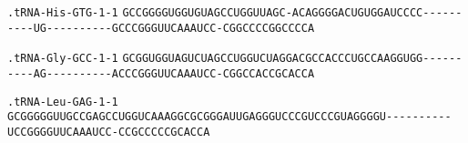 \documentclass{article}
\newcommand{\rnabox}[1]{\colorbox{#1}{\texttt{#1}}}
\begin{document}
\texttt{.tRNA-His-GTG-1-1}
\rnabox{G}\rnabox{C}\rnabox{C}\rnabox{G}\rnabox{G}\rnabox{G}\rnabox{G}\rnabox{U}\rnabox{G}\rnabox{G}\rnabox{U}\rnabox{G}\rnabox{U}\rnabox{A}\rnabox{G}\rnabox{C}\rnabox{C}\rnabox{U}\rnabox{G}\rnabox{G}\rnabox{U}\rnabox{U}\rnabox{A}\rnabox{G}\rnabox{C}\rnabox{-}\rnabox{A}\rnabox{C}\rnabox{A}\rnabox{G}\rnabox{G}\rnabox{G}\rnabox{G}\rnabox{A}\rnabox{C}\rnabox{U}\rnabox{G}\rnabox{U}\rnabox{G}\rnabox{G}\rnabox{A}\rnabox{U}\rnabox{C}\rnabox{C}\rnabox{C}\rnabox{C}\rnabox{-}\rnabox{-}\rnabox{-}\rnabox{-}\rnabox{-}\rnabox{-}\rnabox{-}\rnabox{-}\rnabox{-}\rnabox{-}\rnabox{U}\rnabox{G}\rnabox{-}\rnabox{-}\rnabox{-}\rnabox{-}\rnabox{-}\rnabox{-}\rnabox{-}\rnabox{-}\rnabox{-}\rnabox{-}\rnabox{G}\rnabox{C}\rnabox{C}\rnabox{C}\rnabox{G}\rnabox{G}\rnabox{G}\rnabox{U}\rnabox{U}\rnabox{C}\rnabox{A}\rnabox{A}\rnabox{A}\rnabox{U}\rnabox{C}\rnabox{C}\rnabox{-}\rnabox{C}\rnabox{G}\rnabox{G}\rnabox{C}\rnabox{C}\rnabox{C}\rnabox{C}\rnabox{G}\rnabox{G}\rnabox{C}\rnabox{C}\rnabox{C}\rnabox{C}\rnabox{A}

\vspace{-0.5mm}

\texttt{.tRNA-Gly-GCC-1-1}
\rnabox{G}\rnabox{C}\rnabox{G}\rnabox{G}\rnabox{U}\rnabox{G}\rnabox{G}\rnabox{U}\rnabox{A}\rnabox{G}\rnabox{U}\rnabox{C}\rnabox{U}\rnabox{A}\rnabox{G}\rnabox{C}\rnabox{C}\rnabox{U}\rnabox{G}\rnabox{G}\rnabox{U}\rnabox{C}\rnabox{U}\rnabox{A}\rnabox{G}\rnabox{G}\rnabox{A}\rnabox{C}\rnabox{G}\rnabox{C}\rnabox{C}\rnabox{A}\rnabox{C}\rnabox{C}\rnabox{C}\rnabox{U}\rnabox{G}\rnabox{C}\rnabox{C}\rnabox{A}\rnabox{A}\rnabox{G}\rnabox{G}\rnabox{U}\rnabox{G}\rnabox{G}\rnabox{-}\rnabox{-}\rnabox{-}\rnabox{-}\rnabox{-}\rnabox{-}\rnabox{-}\rnabox{-}\rnabox{-}\rnabox{-}\rnabox{A}\rnabox{G}\rnabox{-}\rnabox{-}\rnabox{-}\rnabox{-}\rnabox{-}\rnabox{-}\rnabox{-}\rnabox{-}\rnabox{-}\rnabox{-}\rnabox{A}\rnabox{C}\rnabox{C}\rnabox{C}\rnabox{G}\rnabox{G}\rnabox{G}\rnabox{U}\rnabox{U}\rnabox{C}\rnabox{A}\rnabox{A}\rnabox{A}\rnabox{U}\rnabox{C}\rnabox{C}\rnabox{-}\rnabox{C}\rnabox{G}\rnabox{G}\rnabox{C}\rnabox{C}\rnabox{A}\rnabox{C}\rnabox{C}\rnabox{G}\rnabox{C}\rnabox{A}\rnabox{C}\rnabox{C}\rnabox{A}

\vspace{-0.5mm}

\texttt{.tRNA-Leu-GAG-1-1}
\rnabox{G}\rnabox{C}\rnabox{G}\rnabox{G}\rnabox{G}\rnabox{G}\rnabox{G}\rnabox{U}\rnabox{U}\rnabox{G}\rnabox{C}\rnabox{C}\rnabox{G}\rnabox{A}\rnabox{G}\rnabox{C}\rnabox{C}\rnabox{U}\rnabox{G}\rnabox{G}\rnabox{U}\rnabox{C}\rnabox{A}\rnabox{A}\rnabox{A}\rnabox{G}\rnabox{G}\rnabox{C}\rnabox{G}\rnabox{C}\rnabox{G}\rnabox{G}\rnabox{G}\rnabox{A}\rnabox{U}\rnabox{U}\rnabox{G}\rnabox{A}\rnabox{G}\rnabox{G}\rnabox{G}\rnabox{U}\rnabox{C}\rnabox{C}\rnabox{C}\rnabox{G}\rnabox{U}\rnabox{C}\rnabox{C}\rnabox{C}\rnabox{G}\rnabox{U}\rnabox{A}\rnabox{G}\rnabox{G}\rnabox{G}\rnabox{G}\rnabox{U}\rnabox{-}\rnabox{-}\rnabox{-}\rnabox{-}\rnabox{-}\rnabox{-}\rnabox{-}\rnabox{-}\rnabox{-}\rnabox{-}\rnabox{U}\rnabox{C}\rnabox{C}\rnabox{G}\rnabox{G}\rnabox{G}\rnabox{G}\rnabox{U}\rnabox{U}\rnabox{C}\rnabox{A}\rnabox{A}\rnabox{A}\rnabox{U}\rnabox{C}\rnabox{C}\rnabox{-}\rnabox{C}\rnabox{C}\rnabox{G}\rnabox{C}\rnabox{C}\rnabox{C}\rnabox{C}\rnabox{C}\rnabox{G}\rnabox{C}\rnabox{A}\rnabox{C}\rnabox{C}\rnabox{A}
\end{document}
